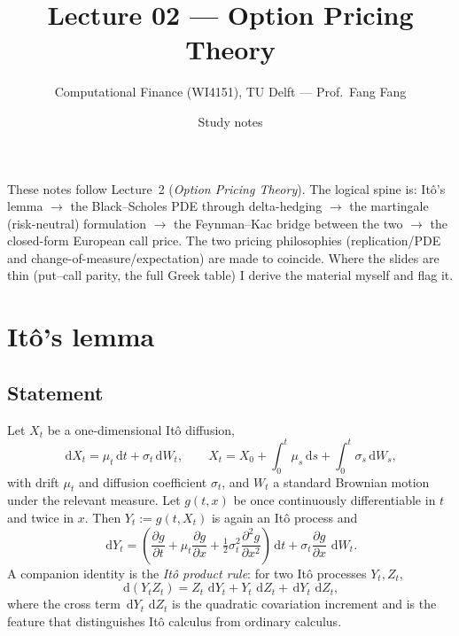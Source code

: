 \documentclass[11pt]{article}
\title{Lecture 02 --- Option Pricing Theory}
\author{Computational Finance (WI4151), TU Delft --- Prof.\ Fang Fang}
\date{Study notes}
\newcommand{\dd}{\,\mathrm{d}}
\begin{document}
\maketitle

\noindent
These notes follow Lecture~2 (\emph{Option Pricing Theory}). The logical spine is:
It\^o's lemma $\to$ the Black--Scholes PDE through delta-hedging $\to$ the martingale
(risk-neutral) formulation $\to$ the Feynman--Kac bridge between the two $\to$ the closed-form
European call price. The two pricing philosophies (replication/PDE and change-of-measure/expectation)
are made to coincide. Where the slides are thin (put--call parity, the full Greek table) I derive the
material myself and flag it.

\tableofcontents

\section{It\^o's lemma}

\subsection{Statement}
Let $X_t$ be a one-dimensional It\^o diffusion,
\begin{equation}
\dd X_t = \mu_t \dd t + \sigma_t \dd W_t,
\qquad
X_t = X_0 + \int_0^t \mu_s \dd s + \int_0^t \sigma_s \dd W_s,
\end{equation}
with drift $\mu_t$ and diffusion coefficient $\sigma_t$, and $W_t$ a standard Brownian motion under
the relevant measure. Let $g(t,x)$ be once continuously differentiable in $t$ and twice in $x$. Then
$Y_t := g(t,X_t)$ is again an It\^o process and
\begin{equation}\label{eq:ito}
\dd Y_t = \left(\frac{\partial g}{\partial t}
+ \mu_t \frac{\partial g}{\partial x}
+ \tfrac{1}{2}\sigma_t^2 \frac{\partial^2 g}{\partial x^2}\right)\dd t
+ \sigma_t \frac{\partial g}{\partial x}\,\dd W_t.
\end{equation}
A companion identity is the \emph{It\^o product rule}: for two It\^o processes $Y_t,Z_t$,
\begin{equation}\label{eq:product}
\dd(Y_t Z_t) = Z_t\,\dd Y_t + Y_t\,\dd Z_t + \dd Y_t\,\dd Z_t,
\end{equation}
where the cross term $\dd Y_t\,\dd Z_t$ is the quadratic covariation increment and is the feature that
distinguishes It\^o calculus from ordinary calculus.
\end{document}
